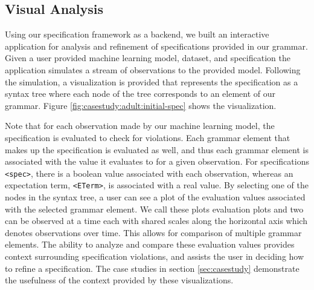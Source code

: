
\subsection{Visual Analysis}
\label{sec:implementation:vis}
Using our specification framework as a backend, we built an interactive application for analysis and refinement of specifications provided in our grammar.
Given a user provided machine learning model, dataset, and specification the application simulates a stream of observations to the provided model.
Following the simulation, a visualization is provided that represents the specification as a syntax tree where each node of the tree corresponds to an element of our grammar.
Figure \ref{fig:casestudy:adult:initial-spec} shows the visualization.

Note that for each observation made by our machine learning model, the specification is evaluated to check for violations.
Each grammar element that makes up the specification is evaluated as well, and thus each grammar element is associated with the value it evaluates to for a given observation.
For specifications \texttt{<spec>}, there is a boolean value associated with each observation, whereas an expectation term, \texttt{<ETerm>}, is associated with a real value.
By selecting one of the nodes in the syntax tree, a user can see a plot of the evaluation values associated with the selected grammar element.
We call these plots evaluation plots and two can be observed at a time 
each with shared scales along the horizontal axis which denotes observations over time.
This allows for comparison of multiple grammar elements.
The ability to analyze and compare these evaluation values provides context surrounding specification violations, and assists the user in deciding how to refine a specification.
The case studies in section \ref{sec:casestudy} demonstrate the usefulness of the context provided by these visualizations.



